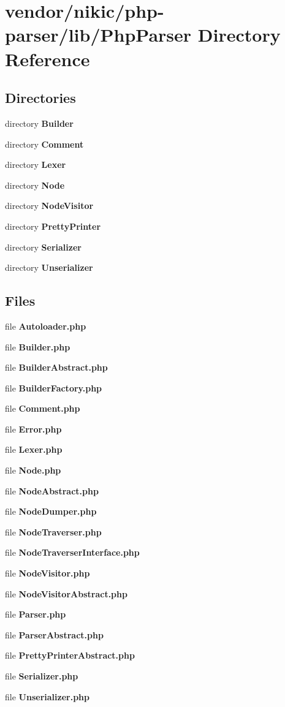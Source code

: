 \section{vendor/nikic/php-\/parser/lib/\+Php\+Parser Directory Reference}
\label{dir_7945ea576f6fc2f039dad8f19027f50f}
\subsection*{Directories}
\begin{DoxyCompactItemize}
\item 
directory {\bf Builder}
\item 
directory {\bf Comment}
\item 
directory {\bf Lexer}
\item 
directory {\bf Node}
\item 
directory {\bf Node\+Visitor}
\item 
directory {\bf Pretty\+Printer}
\item 
directory {\bf Serializer}
\item 
directory {\bf Unserializer}
\end{DoxyCompactItemize}
\subsection*{Files}
\begin{DoxyCompactItemize}
\item 
file {\bf Autoloader.\+php}
\item 
file {\bf Builder.\+php}
\item 
file {\bf Builder\+Abstract.\+php}
\item 
file {\bf Builder\+Factory.\+php}
\item 
file {\bf Comment.\+php}
\item 
file {\bf Error.\+php}
\item 
file {\bf Lexer.\+php}
\item 
file {\bf Node.\+php}
\item 
file {\bf Node\+Abstract.\+php}
\item 
file {\bf Node\+Dumper.\+php}
\item 
file {\bf Node\+Traverser.\+php}
\item 
file {\bf Node\+Traverser\+Interface.\+php}
\item 
file {\bf Node\+Visitor.\+php}
\item 
file {\bf Node\+Visitor\+Abstract.\+php}
\item 
file {\bf Parser.\+php}
\item 
file {\bf Parser\+Abstract.\+php}
\item 
file {\bf Pretty\+Printer\+Abstract.\+php}
\item 
file {\bf Serializer.\+php}
\item 
file {\bf Unserializer.\+php}
\end{DoxyCompactItemize}
